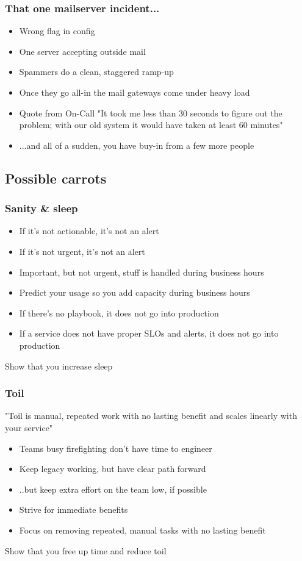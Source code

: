 \documentclass[t]{beamer}
\begin{document}
\begin{frame}
	\frametitle{That one mailserver incident...}
	\begin{itemize}
		\item Wrong flag in config
		\item One server accepting outside mail
		\item Spammers do a clean, staggered ramp-up
		\item Once they go all-in the mail gateways come under heavy load
		\item Quote from On-Call "It took me less than 30 seconds to figure out the problem; with our old system it would have taken at least 60 minutes"
		\item ...and all of a sudden, you have buy-in from a few more people
	\end{itemize}
\end{frame}


\subsection{Possible carrots}


\begin{frame}
	\frametitle{Sanity \& sleep}
	\begin{itemize}
		\item If it's not actionable, it's not an alert
		\item If it's not urgent, it's not an alert
		\item Important, but not urgent, stuff is handled during business hours
		\item Predict your usage so you add capacity during business hours
		\item If there's no playbook, it does not go into production
		\item If a service does not have proper SLOs and alerts, it does not go into production
	\end{itemize}
	\vfill
	Show that you increase sleep
\end{frame}

\begin{frame}
	\frametitle{Toil}
	"Toil is manual, repeated work with no lasting benefit and scales linearly with your service"
	\vfill
	\begin{itemize}
		\item Teams busy firefighting don't have time to engineer
		\item Keep legacy working, but have clear path forward
		\item ..but keep extra effort on the team low, if possible
		\item Strive for immediate benefits
		\item Focus on removing repeated, manual tasks with no lasting benefit
	\end{itemize}
	Show that you free up time and reduce toil
	\vfill
\end{frame}
\end{document}
